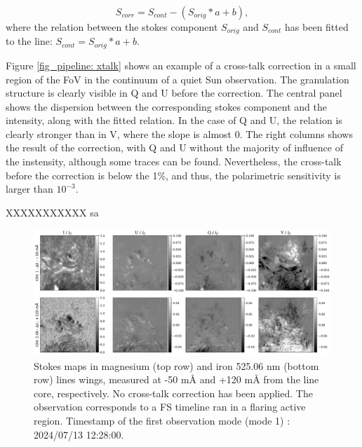 \begin{equation}
  S_{corr} = S_{cont} - (S_{orig} * a + b),
\end{equation}
where the relation between the stokes component $S_{orig}$ and $S_{cont}$ has been fitted to the line: $S_{cont} =  S_{orig} * a + b$.

Figure \ref{fig_pipeline: xtalk} shows an example of a cross-talk correction in a small region of the FoV in the continuum of a quiet Sun observation. The granulation structure is clearly visible in Q and U before the correction. The central panel shows the dispersion between the corresponding  stokes component and the intensity, along with the fitted relation. In the case of Q and U, the relation is clearly stronger than in V, where the slope is almost 0. The right columns shows the result of the correction, with Q and U without the majority of influence of the instensity, although some traces can be found. Nevertheless, the cross-talk before the correction is below the 1\%, and thus, the polarimetric sensitivity is larger than $10^{-3}$.

XXXXXXXXXXX
sa
\begin{figure}[h]
  \includegraphics[width=\textwidth]{figures/Pipeline/Example_demodulation.pdf}
  \caption[Stokes maps for magnesium and iron.]{Stokes maps in magnesium (top row) and iron 525.06 nm (bottom row) lines wings, measured at -50 m\r{A} and +120 m\r{A} from the line core, respectively. No cross-talk correction has been applied. The observation corresponds to a FS timeline ran in a flaring active region. Timestamp of the first observation mode (mode 1) : 2024/07/13 12:28:00.  }
    \label{fig_pipeline: demodulated_data}
\end{figure}

